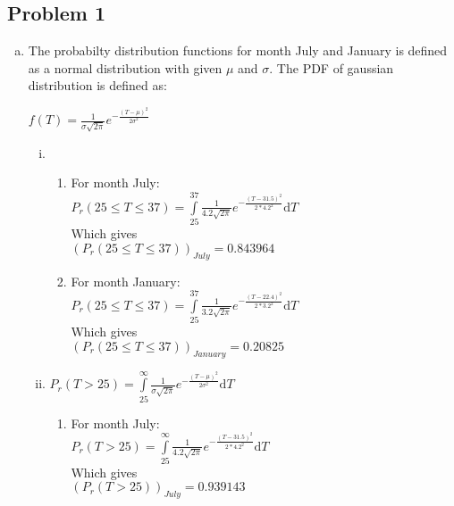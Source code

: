 \documentclass{article}
\begin{document}
\subsection{Problem 1} %
\label{sub:problem_1}
\begin{enumerate}[(a)]
    \item The probabilty distribution functions for month July and January is defined as a normal distribution with given $\mu$ and $\sigma$. The PDF of gaussian distribution is defined as:\\
    \centerline{$f(T) = \frac{1}{\sigma \sqrt{2 \pi}}e^{-\frac{(T-\mu)^2}{2\sigma ^2}}$\\}
        \begin{enumerate}[(i)]
        \item
            \begin{enumerate}[]
                \item For month July:\\
                $P_{r}(25\leq T \leq 37) = \int\limits_{25}^{37} \frac{1}{4.2 \sqrt{2 \pi}}e^{-\frac{(T-31.5)^2}{2*4.2^2}} \mathrm{d} T$\\
                Which gives\\
                $(P_{r}(25\leq T \leq 37))_{July} = 0.843964$\\
                \item For month January:\\
                $P_{r}(25\leq T \leq 37) = \int\limits_{25}^{37} \frac{1}{3.2 \sqrt{2 \pi}}e^{-\frac{(T-22.4)^2}{2*3.2^2}} \mathrm{d} T$\\
                Which gives\\
                $(P_{r}(25\leq T \leq 37))_{January} = 0.20825$\\
            \end{enumerate}
        \item 
            $P_{r}(T>25) = \int\limits_{25}^{\infty} \frac{1}{\sigma \sqrt{2 \pi}}e^{-\frac{(T-\mu)^2}{2\sigma ^2}} \mathrm{d} T$\\
            \begin{enumerate}[]
                \item For month July:\\
                $P_{r}(T>25) = \int\limits_{25}^{\infty} \frac{1}{4.2 \sqrt{2 \pi}}e^{-\frac{(T-31.5)^2}{2*4.2^2}} \mathrm{d} T$\\
                Which gives\\
                $(P_{r}(T>25))_{July} = 0.939143$\\

\end{enumerate}
\end{enumerate}
\end{enumerate}
\end{document}
